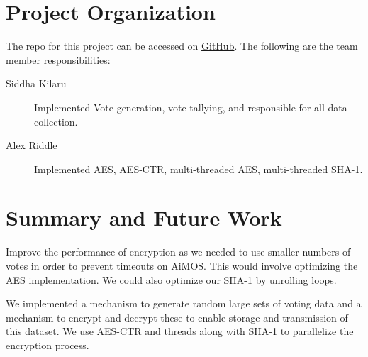 \documentclass[final,5p,times,twocolumn,authoryear, 10pt]{elsarticle}
\newcommand\repo[1]{https://github.com/siddha20/CSCI4320-Project/tree/master/#1}
\begin{document}
\section{Project Organization}
\label{Project Organization}

The repo for this project can be accessed on \href{\repo}{GitHub}.
The following are the team member responsibilities:
\begin{description}
    \item[Siddha Kilaru] Implemented Vote generation, vote tallying, and responsible for all data collection.
    \item[Alex Riddle] Implemented AES, AES-CTR, multi-threaded AES, multi-threaded SHA-1.
\end{description}


\section{Summary and Future Work}
\label{Summary and Future Work}

Improve the performance of encryption as we needed to use smaller
numbers of votes in order to prevent timeouts on AiMOS. This would involve
optimizing the AES implementation. We could also optimize our SHA-1 by
unrolling loops.

We implemented a mechanism to generate random large sets of voting
data and a mechanism to encrypt and decrypt these to enable storage and
transmission of this dataset. We use AES-CTR and threads along with SHA-1 to
parallelize the encryption process.



%  
% 

\end{document}
